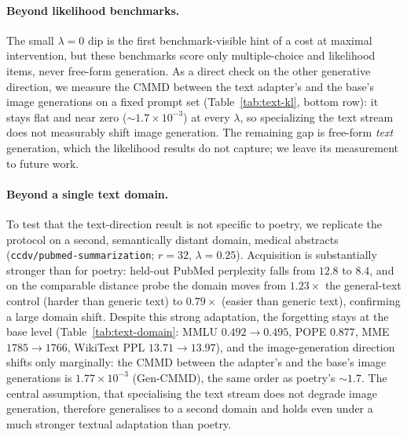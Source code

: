 \documentclass{article}
\begin{document}
\paragraph{Beyond likelihood benchmarks.}
The small $\lambda{=}0$ dip is the first benchmark-visible hint of a cost at maximal
intervention, but these benchmarks score only multiple-choice and likelihood items,
never free-form generation. As a direct check on the other generative direction, we
measure the CMMD between the text adapter's and the base's image generations on a
fixed prompt set (Table~\ref{tab:text-kl}, bottom row): it stays flat and near zero
($\sim\!1.7\times10^{-3}$) at every $\lambda$, so specializing the text stream does
not measurably shift image generation. The remaining gap is free-form \emph{text}
generation, which the likelihood results do not capture; we leave its measurement
to future work.


\paragraph{Beyond a single text domain.}
To test that the text-direction result is not specific to poetry, we replicate the
protocol on a second, semantically distant domain, medical abstracts
(\texttt{ccdv/pubmed-summarization}; $r{=}32$, $\lambda{=}0.25$). Acquisition is
substantially stronger than for poetry: held-out PubMed perplexity falls from
$12.8$ to $8.4$, and on the comparable distance probe the domain moves from
$1.23\times$ the general-text control (harder than generic text) to $0.79\times$
(easier than generic text), confirming a large domain shift. Despite this strong
adaptation, the forgetting stays at the base level
(Table~\ref{tab:text-domain}: MMLU $0.492\!\to\!0.495$, POPE $0.877$, MME
$1785\!\to\!1766$, WikiText PPL $13.71\!\to\!13.97$), and the image-generation
direction shifts only marginally: the CMMD between the adapter's and the base's
image generations is $1.77\times10^{-3}$ (Gen-CMMD), the same order as
poetry's $\sim\!1.7$. The central assumption, that specialising the text stream
does not degrade image generation, therefore generalises to a second domain and
holds even under a much stronger textual adaptation than poetry.
\end{document}
